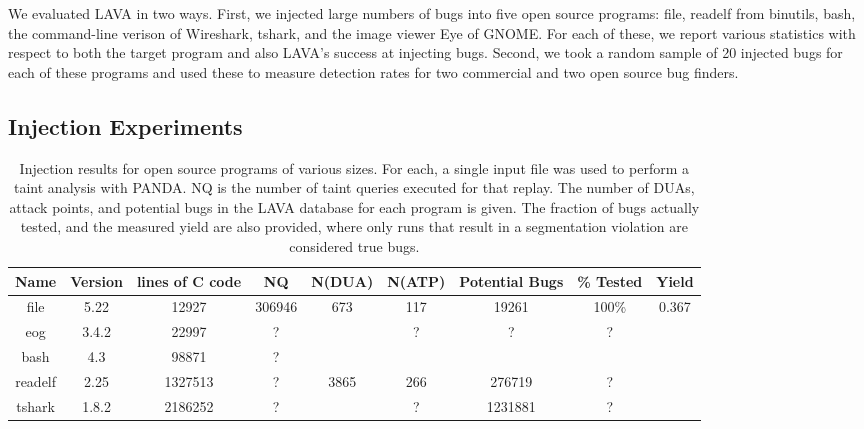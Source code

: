 
\label{section:results}

We evaluated LAVA in two ways.
First, we injected large numbers of bugs into five open source programs: file, readelf from binutils, bash, the command-line verison of Wireshark, tshark, and the image viewer Eye of GNOME.
For each of these, we report various statistics with respect to both the target program and also LAVA's success at injecting bugs. 
Second, we took a random sample of 20 injected bugs for each of these programs and used these to measure detection rates for two commercial and two open source bug finders.

\subsection{Injection Experiments}


\begin{table*}[t]
\centering
\begin{tabular}{c|c|c|c|c|c|c|c|c} 
Name    & Version & lines of C code & NQ      &  N(DUA) & N(ATP) & Potential Bugs & \% Tested & Yield \\ \hline
file    & 5.22    & 12927           & 306946  & 673     & 117    & 19261          & 100\%     & 0.367  \\
eog     & 3.4.2   & 22997           & ?       &         & ?      & ?              & ?         &  \\
bash    & 4.3     & 98871           & ?       &         &        &                &           &  \\
readelf & 2.25    & 1327513         & ?       &  3865   & 266    & 276719         & ?         &  \\
tshark  & 1.8.2   & 2186252         & ?       &         & ?      & 1231881        & ?         &  \\
\end{tabular}
\caption{Injection results for open source programs of various sizes.
For each, a single input file was used to perform a taint analysis with PANDA.
NQ is the number of taint queries executed for that replay.
The number of DUAs, attack points, and potential bugs in the LAVA database for each program is given.
The fraction of bugs actually tested, and the measured yield are also provided, where only runs that result in a segmentation violation are considered true bugs.
}
\end{table*}

